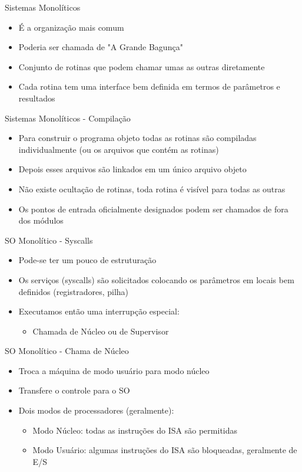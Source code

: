 \documentclass{beamer}
\begin{document}
\begin{frame}{Sistemas Monolíticos}
    \begin{itemize}
        \item É a organização mais comum
        \item Poderia ser chamada de "A Grande Bagunça"
        \item Conjunto de rotinas que podem chamar umas
        as outras diretamente
        \item Cada rotina tem uma interface bem definida
        em termos de parâmetros e resultados
    \end{itemize}
\end{frame}
\begin{frame}{Sistemas Monolíticos - Compilação}
    \begin{itemize}
        \item Para construir o programa objeto todas as
        rotinas são compiladas individualmente (ou os
        arquivos que contém as rotinas)
        \item Depois esses arquivos são linkados em um
        único arquivo objeto
        \item Não existe ocultação de rotinas, toda rotina é
        visível para todas as outras
        \item Os pontos de entrada oficialmente designados
        podem ser chamados de fora dos módulos
    \end{itemize}
\end{frame}
\begin{frame}{SO Monolítico - Syscalls}
    \begin{itemize}
        \item Pode-se ter um pouco de estruturação
        \item Os serviços (syscalls) são solicitados colocando
        os parâmetros em locais bem definidos
        (registradores, pilha)
        \item Executamos então uma interrupção especial:
        \begin{itemize}
            \item Chamada de Núcleo ou de Supervisor
        \end{itemize}
    \end{itemize}
\end{frame}
\begin{frame}{SO Monolítico - Chama de Núcleo}
    \begin{itemize}
        \item Troca a máquina de modo usuário para modo núcleo
        \item Transfere o controle para o SO
        \item Dois modos de processadores (geralmente):
        \begin{itemize}
            \item Modo Núcleo: todas as instruções do ISA são permitidas
            \item Modo Usuário: algumas instruções do ISA são bloqueadas, geralmente de E/S
        \end{itemize}
    \end{itemize}
\end{frame}
\end{document}

